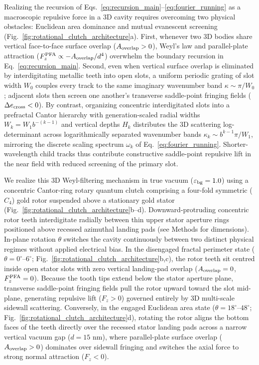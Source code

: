 \documentclass[pdflatex,sn-nature]{sn-jnl}
\begin{document}
Realizing the recursion of Eqs.~\eqref{eq:recursion_main}--\eqref{eq:fourier_running} as a macroscopic repulsive force in a 3D cavity requires overcoming two physical obstacles: Euclidean area dominance and mutual evanescent screening (Fig.~\ref{fig:rotational_clutch_architecture}a). First, whenever two 3D bodies share vertical face-to-face surface overlap ($A_{\rm overlap} > 0$), Weyl's law and parallel-plate attraction ($F_z^{\rm PFA} \propto -A_{\rm overlap}/d^4$) overwhelm the boundary recursion in Eq.~\eqref{eq:recursion_main}\cite{lapidus1991}. Second, even when vertical surface overlap is eliminated by interdigitating metallic teeth into open slots\cite{levin2010}, a uniform periodic grating of slot width $W_0$ couples every track to the same imaginary wavenumber band $\kappa \sim \pi/W_0$; adjacent slots then screen one another's transverse saddle-point fringing fields ($\Delta e_{\rm cross} < 0$). By contrast, organizing concentric interdigitated slots into a prefractal Cantor hierarchy with generation-scaled radial widths $W_k = W_1 b^{-(k-1)}$ and vertical depths $H_k$ distributes the 3D scattering log-determinant across logarithmically separated wavenumber bands $\kappa_k \sim b^{k-1}\pi/W_1$, mirroring the discrete scaling spectrum $\omega_k$ of Eq.~\eqref{eq:fourier_running}. Shorter-wavelength child tracks thus contribute constructive saddle-point repulsive lift in the near field with reduced screening of the primary slot.

We realize this 3D Weyl-filtering mechanism in true vacuum ($\varepsilon_{\rm bg}=1.0$) using a concentric Cantor-ring rotary quantum clutch comprising a four-fold symmetric ($C_4$) gold rotor suspended above a stationary gold stator (Fig.~\ref{fig:rotational_clutch_architecture}b--d). Downward-protruding concentric rotor teeth interdigitate radially between thin upper stator aperture rings positioned above recessed azimuthal landing pads (see Methods for dimensions). In-plane rotation $\theta$ switches the cavity continuously between two distinct physical regimes without applied electrical bias. In the disengaged fractal perimeter state ($\theta = 0^\circ\text{--}6^\circ$; Fig.~\ref{fig:rotational_clutch_architecture}b,c), the rotor teeth sit centred inside open stator slots with zero vertical landing-pad overlap ($A_{\rm overlap} = 0$, $F_z^{\rm PFA} = 0$). Because the tooth tips extend below the stator aperture plane, transverse saddle-point fringing fields pull the rotor upward toward the slot mid-plane, generating repulsive lift ($F_z > 0$) governed entirely by 3D multi-scale sidewall scattering. Conversely, in the engaged Euclidean area state ($\theta = 18^\circ\text{--}48^\circ$; Fig.~\ref{fig:rotational_clutch_architecture}d), rotating the rotor aligns the bottom faces of the teeth directly over the recessed stator landing pads across a narrow vertical vacuum gap ($d = 15\text{ nm}$), where parallel-plate surface overlap ($A_{\rm overlap} > 0$) dominates over sidewall fringing and switches the axial force to strong normal attraction ($F_z < 0$).
\end{document}
